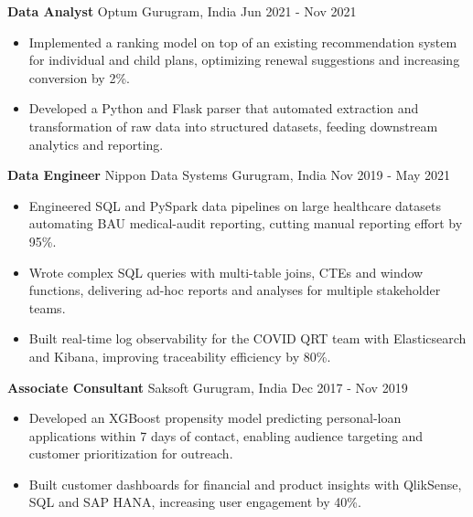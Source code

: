 \documentclass[10pt,a4paper]{article}
\newcommand{\role}[4]{\textbf{#1} \textbar{} #2 \hfill #3 \textbar{} #4\par}
\begin{document}
\vspace{3pt}
\role{Data Analyst}{Optum}{Gurugram, India}{Jun 2021 - Nov 2021}
\begin{itemize}
  \item Implemented a ranking model on top of an existing recommendation system for individual and child plans, optimizing renewal suggestions and increasing conversion by 2\%.
  \item Developed a Python and Flask parser that automated extraction and transformation of raw data into structured datasets, feeding downstream analytics and reporting.
\end{itemize}
\vspace{3pt}
\role{Data Engineer}{Nippon Data Systems}{Gurugram, India}{Nov 2019 - May 2021}
\begin{itemize}
  \item Engineered SQL and PySpark data pipelines on large healthcare datasets automating BAU medical-audit reporting, cutting manual reporting effort by 95\%.
  \item Wrote complex SQL queries with multi-table joins, CTEs and window functions, delivering ad-hoc reports and analyses for multiple stakeholder teams.
  \item Built real-time log observability for the COVID QRT team with Elasticsearch and Kibana, improving traceability efficiency by 80\%.
\end{itemize}
\vspace{3pt}
\role{Associate Consultant}{Saksoft}{Gurugram, India}{Dec 2017 - Nov 2019}
\begin{itemize}
  \item Developed an XGBoost propensity model predicting personal-loan applications within 7 days of contact, enabling audience targeting and customer prioritization for outreach.
  \item Built customer dashboards for financial and product insights with QlikSense, SQL and SAP HANA, increasing user engagement by 40\%.
\end{itemize}
\end{document}
